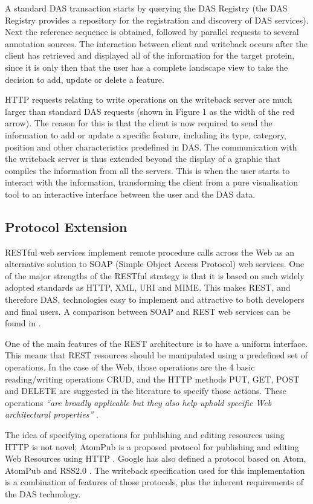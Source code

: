 A standard DAS transaction starts by querying the DAS Registry (the DAS Registry provides a repository for the registration and discovery of DAS services). Next the reference sequence is obtained, followed by parallel requests to several annotation sources. The interaction between client and writeback occurs after the client has retrieved and displayed all of the information for the target protein, since it is only then that the user has a complete landscape view to take the decision to add, update or delete a feature.

HTTP requests relating to write operations on the writeback server are much larger than standard DAS requests (shown in Figure 1 as the width of the red arrow). The reason for this is that the client is now required to send the information to add or update a specific feature, including its type, category, position and other characteristics predefined in DAS. The communication with the writeback server is thus extended beyond the display of a graphic that compiles the information from all the servers. This is when the user starts to interact with the information, transforming the client from a pure visualisation tool to an interactive interface between the user and the DAS data.

\subsection{Protocol Extension}	
RESTful web services implement remote procedure calls across the Web as an alternative solution to SOAP (Simple Object Access Protocol) web services. One of the major strengths of the RESTful strategy is that it is based on such widely adopted standards as HTTP, XML, URI and MIME. This makes REST, and therefore DAS, technologies easy to implement and attractive to both developers and final users. A comparison between SOAP and REST web services can be found in \cite{PAU2008}.

One of the main features of the REST architecture is to have a uniform interface. This means that REST resources should be manipulated using a predefined set of operations. In the case of the Web, those operations are the 4 basic reading/writing operations CRUD, and the HTTP methods PUT, GET, POST and DELETE are suggested in the literature to specify those actions. These operations \textit{``are broadly applicable but they also help uphold specific Web architectural properties''} \cite{VIN2008}.

The idea of specifying operations for publishing and editing resources using HTTP is not novel; AtomPub is a proposed protocol for publishing and editing Web Resources using HTTP \cite{GRE2007}. Google has also defined a protocol based on Atom, AtomPub and RSS2.0 \cite{GOO2009}. The writeback specification used for this implementation is a combination of features of those protocols, plus the inherent requirements of the DAS technology. 


